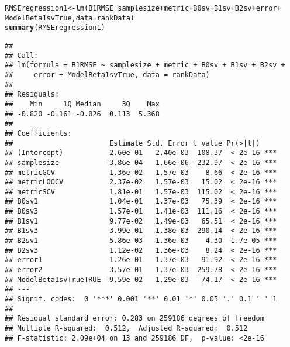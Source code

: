 \documentclass{article}\usepackage[]{graphicx}\usepackage[]{color}
\makeatletter
\newcommand{\hlopt}[1]{\textcolor[rgb]{0,0,0}{#1}}%
\newcommand{\hlstd}[1]{\textcolor[rgb]{0.345,0.345,0.345}{#1}}%
\newcommand{\hlkwb}[1]{\textcolor[rgb]{0.69,0.353,0.396}{#1}}%
\newcommand{\hlkwc}[1]{\textcolor[rgb]{0.333,0.667,0.333}{#1}}%
\newcommand{\hlkwd}[1]{\textcolor[rgb]{0.737,0.353,0.396}{\textbf{#1}}}%
\newenvironment{kframe}{%
 \def\at@end@of@kframe{}%
 \ifinner\ifhmode%
  \def\at@end@of@kframe{\end{minipage}}%
  \begin{minipage}{\columnwidth}%
 \fi\fi%
 \def\FrameCommand##1{\hskip\@totalleftmargin \hskip-\fboxsep
 \colorbox{shadecolor}{##1}\hskip-\fboxsep
     \hskip-\linewidth \hskip-\@totalleftmargin \hskip\columnwidth}%
 \MakeFramed {\advance\hsize-\width
   \@totalleftmargin\z@ \linewidth\hsize
   \@setminipage}}%
 {\par\unskip\endMakeFramed%
 \at@end@of@kframe}
\newenvironment{knitrout}{}{} %
\makeatother
\begin{document}
\begin{knitrout}
\color{fgcolor}\begin{kframe}
\begin{alltt}
\hlstd{RMSEregression1} \hlkwb{<-} \hlkwd{lm}\hlstd{(B1RMSE} \hlopt{~} \hlstd{samplesize} \hlopt{+} \hlstd{metric} \hlopt{+} \hlstd{B0sv} \hlopt{+} \hlstd{B1sv} \hlopt{+} \hlstd{B2sv} \hlopt{+} \hlstd{error} \hlopt{+}
    \hlstd{ModelBeta1svTrue,} \hlkwc{data} \hlstd{= rankData)}
\hlkwd{summary}\hlstd{(RMSEregression1)}
\end{alltt}
\begin{verbatim}
## 
## Call:
## lm(formula = B1RMSE ~ samplesize + metric + B0sv + B1sv + B2sv + 
##     error + ModelBeta1svTrue, data = rankData)
## 
## Residuals:
##    Min     1Q Median     3Q    Max 
## -0.820 -0.161 -0.026  0.113  5.368 
## 
## Coefficients:
##                       Estimate Std. Error t value Pr(>|t|)    
## (Intercept)           2.60e-01   2.40e-03  108.37  < 2e-16 ***
## samplesize           -3.86e-04   1.66e-06 -232.97  < 2e-16 ***
## metricGCV             1.36e-02   1.57e-03    8.66  < 2e-16 ***
## metricLOOCV           2.37e-02   1.57e-03   15.02  < 2e-16 ***
## metricSCV             1.81e-01   1.57e-03  115.02  < 2e-16 ***
## B0sv1                 1.04e-01   1.37e-03   75.39  < 2e-16 ***
## B0sv3                 1.57e-01   1.41e-03  111.16  < 2e-16 ***
## B1sv1                 9.77e-02   1.49e-03   65.51  < 2e-16 ***
## B1sv3                 3.99e-01   1.38e-03  290.14  < 2e-16 ***
## B2sv1                 5.86e-03   1.36e-03    4.30  1.7e-05 ***
## B2sv3                 1.12e-02   1.36e-03    8.24  < 2e-16 ***
## error1                1.26e-01   1.37e-03   91.92  < 2e-16 ***
## error2                3.57e-01   1.37e-03  259.78  < 2e-16 ***
## ModelBeta1svTrueTRUE -9.59e-02   1.29e-03  -74.17  < 2e-16 ***
## ---
## Signif. codes:  0 '***' 0.001 '**' 0.01 '*' 0.05 '.' 0.1 ' ' 1
## 
## Residual standard error: 0.283 on 259186 degrees of freedom
## Multiple R-squared:  0.512,	Adjusted R-squared:  0.512 
## F-statistic: 2.09e+04 on 13 and 259186 DF,  p-value: <2e-16
\end{verbatim}
\end{kframe}
\end{knitrout}
\end{document}
